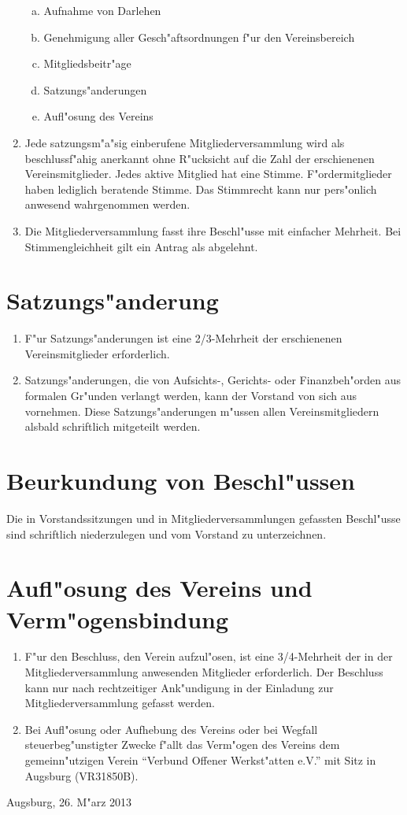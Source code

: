 \documentclass[a5paper, ngerman, 10pt]{scrreprt}
\begin{document}
\begin{enumerate}[(1)]
\begin{enumerate}[a.]
        \item Aufnahme von Darlehen
        \item Genehmigung aller Gesch"aftsordnungen f"ur den Vereinsbereich
        \item Mitgliedsbeitr"age
        \item Satzungs"anderungen
        \item Aufl"osung des Vereins
    \end{enumerate}
    \item Jede satzungsm"a"sig einberufene Mitgliederversammlung wird als
        beschlussf"ahig anerkannt ohne R"ucksicht auf die Zahl der erschienenen
        Vereinsmitglieder. Jedes aktive Mitglied hat eine Stimme.
        F"ordermitglieder haben lediglich beratende Stimme. Das Stimmrecht kann
        nur pers"onlich anwesend wahrgenommen werden.
    \item Die Mitgliederversammlung fasst ihre Beschl"usse mit einfacher
        Mehrheit. Bei Stimmengleichheit gilt ein Antrag als abgelehnt.
\end{enumerate}


\section{Satzungs"anderung}
\begin{enumerate}[(1)]
    \item F"ur Satzungs"anderungen ist eine 2/3-Mehrheit der erschienenen
        Vereinsmitglieder erforderlich.
    \item Satzungs"anderungen, die von Aufsichts-, Gerichts- oder
        Finanzbeh"orden aus formalen Gr"unden verlangt werden, kann der Vorstand
        von sich aus vornehmen. Diese Satzungs"anderungen m"ussen allen
        Vereinsmitgliedern alsbald schriftlich mitgeteilt werden.
\end{enumerate}


\section{Beurkundung von Beschl"ussen}
Die in Vorstandssitzungen und in Mitgliederversammlungen gefassten Beschl"usse
sind schriftlich niederzulegen und vom Vorstand zu unterzeichnen.


\section{Aufl"osung des Vereins und Verm"ogensbindung}
\begin{enumerate}[(1)]
    \item F"ur den Beschluss, den Verein aufzul"osen, ist eine 3/4-Mehrheit der
        in der Mitgliederversammlung anwesenden Mitglieder erforderlich. Der
        Beschluss kann nur nach rechtzeitiger Ank"undigung in der Einladung zur
        Mitgliederversammlung gefasst werden.
    \item Bei Aufl"osung oder Aufhebung des Vereins oder bei Wegfall
        steuerbeg"unstigter Zwecke f"allt das Verm"ogen des Vereins dem
        gemeinn"utzigen Verein "`Verbund Offener Werkst"atten e.V."' mit Sitz in
        Augsburg (VR31850B).
\end{enumerate}

\vspace{\fill}
Augsburg, 26. M"arz 2013
\end{document}
